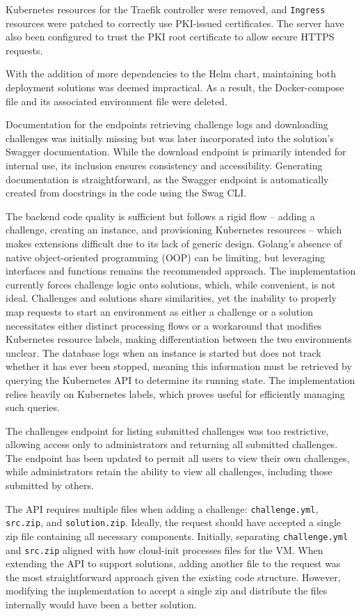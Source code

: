 Kubernetes resources for the Traefik controller were removed, and \texttt{Ingress} resources were patched to correctly use PKI-issued certificates. The server have also been configured to trust the PKI root certificate to allow secure HTTPS requests. 

With the addition of more dependencies to the Helm chart, maintaining both deployment solutions was deemed impractical. As a result, the Docker-compose file and its associated environment file were deleted.

Documentation for the endpoints retrieving challenge logs and downloading challenges was initially missing but was later incorporated into the solution's Swagger documentation. While the download endpoint is primarily intended for internal use, its inclusion ensures consistency and accessibility. Generating documentation is straightforward, as the Swagger endpoint is automatically created from docstrings in the code using the Swag CLI.

The backend code quality is sufficient but follows a rigid flow -- adding a challenge, creating an instance, and provisioning Kubernetes resources -- which makes extensions difficult due to its lack of generic design. Golang's absence of native object-oriented programming (OOP) can be limiting, but leveraging interfaces and functions remains the recommended approach. The implementation currently forces challenge logic onto solutions, which, while convenient, is not ideal. Challenges and solutions share similarities, yet the inability to properly map requests to start an environment as either a challenge or a solution necessitates either distinct processing flows or a workaround that modifies Kubernetes resource labels, making differentiation between the two environments unclear. The database logs when an instance is started but does not track whether it has ever been stopped, meaning this information must be retrieved by querying the Kubernetes API to determine its running state. The implementation relies heavily on Kubernetes labels, which proves useful for efficiently managing such queries.

The challenges endpoint for listing submitted challenges was too restrictive, allowing access only to administrators and returning all submitted challenges. The endpoint has been updated to permit all users to view their own challenges, while administrators retain the ability to view all challenges, including those submitted by others.

The API requires multiple files when adding a challenge: \texttt{challenge.yml}, \texttt{src.zip}, and \texttt{solution.zip}. Ideally, the request should have accepted a single zip file containing all necessary components. Initially, separating \texttt{challenge.yml} and \texttt{src.zip} aligned with how cloud-init processes files for the VM. When extending the API to support solutions, adding another file to the request was the most straightforward approach given the existing code structure. However, modifying the implementation to accept a single zip and distribute the files internally would have been a better solution.

